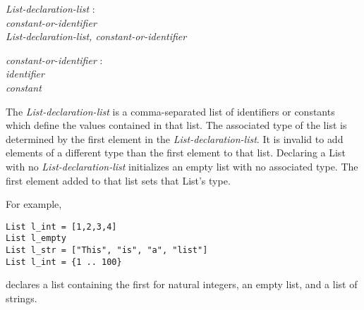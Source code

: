 \documentclass{article}
\begin{document}
\begin{tabbing}
	\= \emph{List}\=\emph{-declaration-list} : \\
		\> \> \emph{constant-or-identifier} \\
		\>\> \emph{List-declaration-list, constant-or-identifier}
\end{tabbing}
\begin{tabbing}
	\= \emph{const}\=\emph{ant-or-identifier} : \\
		\> \> \emph{identifier} \\
		\>\> \emph{constant}
\end{tabbing}

The \emph{List-declaration-list} is a comma-separated list of identifiers or constants which define the values contained in that list. The associated type of the list is determined by the first element in the \emph{List-declaration-list}. It is invalid to add elements of a different type than the first element to that list. Declaring a List with no \emph{List-declaration-list} initializes an empty list with no associated type. The first element added to that list sets that List's type. 

For example,
\begin{lstlisting}
List l_int = [1,2,3,4]
List l_empty
List l_str = ["This", "is", "a", "list"]
List l_int = {1 .. 100}
\end{lstlisting}
declares a list containing the first for natural integers, an empty list, and a list of strings.
\end{document}
